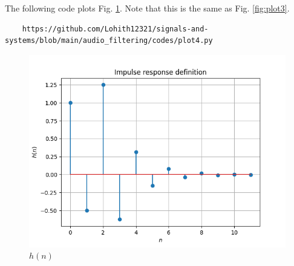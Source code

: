 \documentclass[journal,12pt,twocolumn]{IEEEtran}
\theoremstyle{remark}
\begin{document}
\begin{enumerate}[label=\thesection.\arabic*
,ref=\thesection.\theenumi]
\begin{enumerate}[label=\thesection.\arabic*
,ref=\thesection.\theenumi]
\begin{enumerate}[label=\thesection.\arabic*
,ref=\thesection.\theenumi]
The following code plots Fig. \ref{fig:plot4}. Note that this is the same as Fig. 
\ref{fig:plot3}. 
\begin{lstlisting}
    https://github.com/Lohith12321/signals-and-systems/blob/main/audio_filtering/codes/plot4.py
\end{lstlisting}
\begin{figure}[ht]
    \centering  
\includegraphics[width=\columnwidth]{figs/plot4.png}
\begin{center}
    \caption{$h(n)$}
\end{center}
    \label{fig:plot4}
\end{figure}



\end{enumerate}
\end{enumerate}
\end{enumerate}
\end{document}
